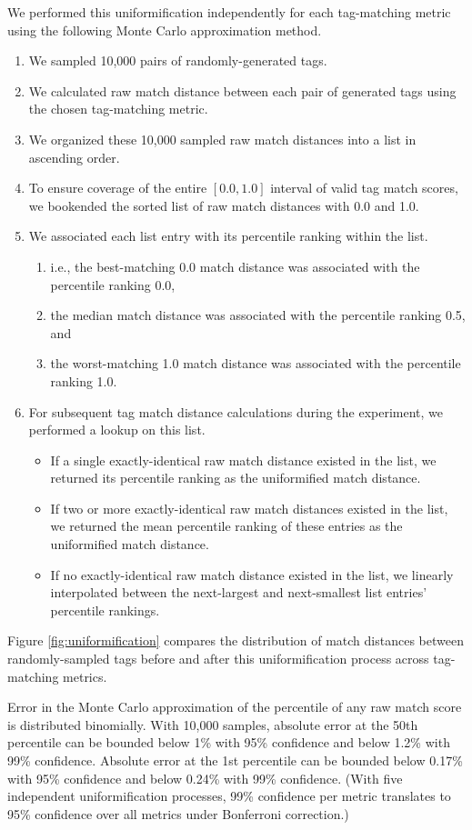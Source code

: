 We performed this uniformification independently for each tag-matching metric using the following Monte Carlo approximation method.
\begin{enumerate}
\item We sampled 10,000 pairs of randomly-generated tags.
\item We calculated raw match distance between each pair of generated tags using the chosen tag-matching metric.
\item We organized these 10,000 sampled raw match distances into a list in ascending order.
\item To ensure coverage of the entire $[0.0,1.0]$ interval of valid tag match scores, we bookended the sorted list of raw match distances with 0.0 and 1.0.
\item We associated each list entry with its percentile ranking within the list.
\begin{enumerate}
    \item i.e., the best-matching 0.0 match distance was associated with the percentile ranking 0.0,
    \item the median match distance was associated with the percentile ranking 0.5, and
    \item the worst-matching 1.0 match distance was associated with the percentile ranking 1.0.
\end{enumerate}
\item For subsequent tag match distance calculations during the experiment, we performed a lookup on this list.
\begin{itemize}
    \item If a single exactly-identical raw match distance existed in the list, we returned its percentile ranking as the uniformified match distance.
    \item If two or more exactly-identical raw match distances existed in the list, we returned the mean percentile ranking of these entries as the uniformified match distance.
    \item If no exactly-identical raw match distance existed in the list, we linearly interpolated between the next-largest and next-smallest list entries' percentile rankings.
\end{itemize}
\end{enumerate}
Figure \ref{fig:uniformification} compares the distribution of match distances between randomly-sampled tags before and after this uniformification process across tag-matching metrics.

Error in the Monte Carlo approximation of the percentile of any raw match score is distributed binomially.
With 10,000 samples, absolute error at the 50th percentile can be bounded below 1\% with 95\% confidence and below 1.2\% with 99\% confidence.
Absolute error at the 1st percentile can be bounded below 0.17\% with 95\% confidence and below 0.24\% with 99\% confidence.
(With five independent uniformification processes, 99\% confidence per metric translates to 95\% confidence over all metrics under Bonferroni correction.)

